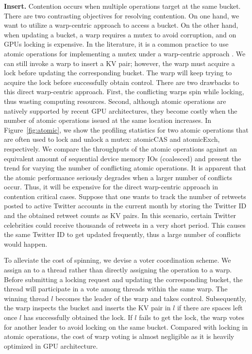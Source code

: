 \vspace{1mm}\noindent\textbf{Insert.} Contention occurs when multiple  operations target at the same bucket. 
There are two contrasting objectives for resolving contention. On one hand, we want to utilize a warp-centric approach to access a bucket.
On the other hand, when updating a bucket, a warp requires a mutex to avoid corruption, and on GPUs locking is expensive.  
In the literature, it is a common practice to use atomic operations for implementing a mutex under a warp-centric approach \cite{zhang2015mega}. 
We can still invoke a warp to insert a KV pair; however, the warp must acquire a lock before updating the corresponding bucket. 
The warp will keep trying to acquire the lock before successfully obtain control. 
There are two drawbacks to this direct warp-centric approach. 
First, the conflicting warps spin while locking, thus wasting computing resources.
Second, although atomic operations are natively supported by recent GPU architectures, 
they become costly when the number of atomic operations issued at the same location increases. 
In Figure~\ref{fig:atomic}, we show the profiling statistics for two atomic operations that are often used to lock and unlock a mutex: atomicCAS and atomicExch, respectively. 
We compare the throughputs of the atomic operations against an equivalent amount of sequential device memory IOs (coalesced) and present the trend for varying the number of conflicting atomic operations. It is apparent that the atomic performance seriously degrades when a larger number of conflicts occur. 
Thus, it will be expensive for the direct warp-centric approach in contention critical cases. 
Suppose that one wants to track the number of retweets posted to active Twitter accounts in the current month by storing the Twitter ID and the obtained retweet counts as KV pairs. In this scenario, certain Twitter celebrities could receive thousands of retweets in a very short period. 
This causes the same Twitter ID to get updated frequently, thus a large number of conflicts would happen. 




To alleviate the cost of spinning, we devise a voter coordination scheme. 
We assign an  to a thread rather than directly assigning the operation to a warp. Before submitting a locking request and updating the corresponding bucket, the thread will participate in a vote among threads within the same warp. 
The winning thread $l$ becomes the leader of the warp and takes control. Subsequently, the warp inspects the bucket and inserts the KV pair in $l$ if there are spaces left once $l$ has successfully obtained the lock.
If $l$ fails to get the lock, the warp votes for another leader to avoid locking on the same bucket.
Compared with locking in atomic operations, the cost of warp voting is almost negligible as it is heavily optimized in GPU architecture.  


